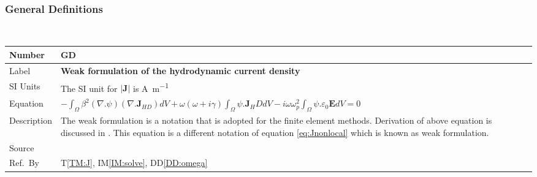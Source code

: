 \documentclass[12pt]{article}
\newcommand{\colBwidth}{0.82\textwidth} \newcommand{\colCwidth}{0.1\textwidth}
\newcounter{defnum} %
\begin{document}
	~\newline
	
	
	\subsubsection{General Definitions}\label{sec_gendef}
	~\newline \noindent \begin{minipage}{\textwidth}
		\renewcommand*{\arraystretch}{1.5} \begin{tabular}{| p{\colAwidth} |
				p{\colBwidth}|} \hline \rowcolor[gray]{0.9} Number&
			GD{defnum}\thedefnum \label{GD:weakJ}\\ \hline Label &\bf Weak
			formulation of the hydrodynamic current density  \\ \hline %
			SI Units& The SI unit for $|\textbf{J}|$ is \si{\ampere \per \metre}\\ \hline
			Equation& $-\int_\Omega
			\beta^2(\nabla.\psi)(\nabla.\textbf{J}_{HD})dV+\omega(\omega+i\gamma)\int_{\Omega} \psi. \textbf{J}_HD dV - i\omega \omega^2_p \int_\Omega \psi.\varepsilon_{0}\textbf{E}dV = 0 $ \\ \hline Description & The weak formulation is a notation that is adopted for the finite element methods. Derivation of above equation is discussed in \cite{hiremath2012numerical}. This equation is a different notation of equation \ref{eq:Jnonlocal} which is known as weak formulation. \\ \hline Source & \cite{hiremath2012numerical}  \\ \hline Ref.\ By & T\ref{TM:J}, IM\ref{IM:solve}, DD\ref{DD:omega}\\ \hline \end{tabular} \end{minipage}\\
	
	
	~\newline
	
\end{document}
